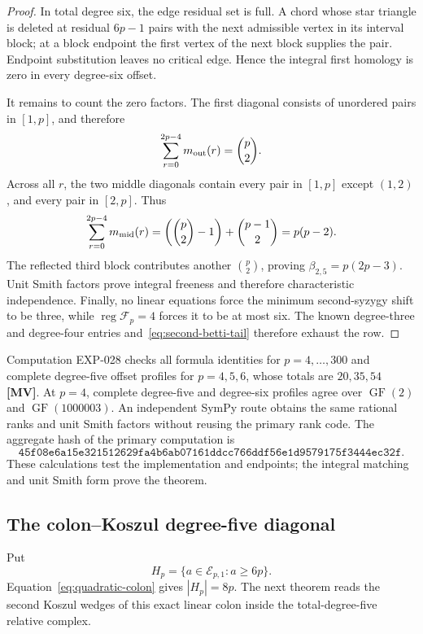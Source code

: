 \documentclass[11pt]{article}
\theoremstyle{definition}
\theoremstyle{remark}
\begin{document}
\begin{proof}
In total degree six, the edge residual set is full. A chord whose star triangle is deleted at
residual \(6p-1\) pairs with the next admissible vertex in its interval block; at a block endpoint
the first vertex of the next block supplies the pair. Endpoint substitution leaves no critical
edge. Hence the integral first homology is zero in every degree-six offset.

It remains to count the zero factors. The first diagonal consists of unordered pairs in
\([1,p]\), and therefore
\[
\sum_{r=0}^{2p-4}m_{\rm out}(r)=\binom p2.
\]
Across all \(r\), the two middle diagonals contain every pair in \([1,p]\) except \((1,2)\), and
every pair in \([2,p]\). Thus
\[
\sum_{r=0}^{2p-4}m_{\rm mid}(r)
=\left(\binom p2-1\right)+\binom{p-1}{2}=p(p-2).
\]
The reflected third block contributes another \(\binom p2\), proving
\(\beta_{2,5}=p(2p-3)\). Unit Smith factors prove integral freeness and therefore
characteristic independence. Finally, no linear equations force the minimum second-syzygy shift
to be three, while \(\operatorname{reg}\mathcal F_p=4\) forces it to be at most six. The known
degree-three and degree-four entries and~\eqref{eq:second-betti-tail} therefore exhaust the row.
\end{proof}

Computation EXP-028 checks all formula identities for \(p=4,\ldots,300\) and complete degree-five
offset profiles for \(p=4,5,6\), whose totals are \(20,35,54\) \textbf{[MV]}. At \(p=4\), complete
degree-five and degree-six profiles agree over \(\operatorname{GF}(2)\) and
\(\operatorname{GF}(1000003)\). An independent SymPy route obtains the same rational ranks and
unit Smith factors without reusing the primary rank code. The aggregate hash of the primary
computation is
\[
\texttt{45f08e6a15e321512629fa4b6ab07161ddcc766ddf56e1d9579175f3444ec32f}.
\]
These calculations test the implementation and endpoints; the integral matching and unit Smith
form prove the theorem.

\subsection{The colon--Koszul degree-five diagonal}

Put
\begin{equation}
H_p=\{a\in\mathcal E_{p,1}:a\ge6p\}.
\label{eq:high-colon-set}
\end{equation}
Equation~\eqref{eq:quadratic-colon} gives \(|H_p|=8p\). The next theorem reads the second Koszul
wedges of this exact linear colon inside the total-degree-five relative complex.
\end{document}
